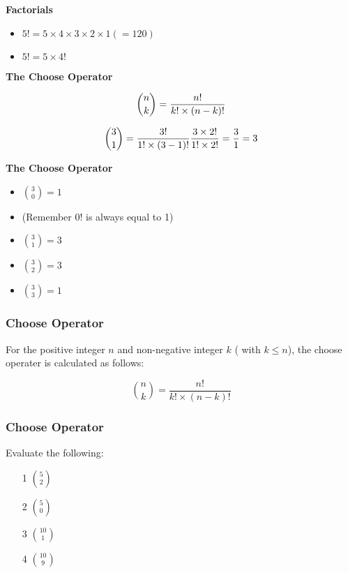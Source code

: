 \documentclass[IntroMain.tex]{subfiles}
\begin{document}
\begin{frame}

\textbf{Factorials}


\begin{itemize}
\item $5! = 5 \times 4 \times 3\times 2 \times 1 (= 120)$
\item $5! = 5 \times 4!$
\end{itemize}


\end{frame}
\begin{frame}
\textbf{The Choose Operator}


\[{n\choose k}  = { n! \over k! \times(n-k)!} \]

\[{3\choose 1}  = { 3! \over 1! \times(3-1)!} { 3 \times 2! \over 1! \times 2!} = \frac{3}{1} = 3 \]


\end{frame}
\begin{frame}
	\textbf{The Choose Operator}

\begin{itemize}
\item ${3 \choose 0} = 1$
\item (Remember $0!$  is always equal to 1)
\item ${3 \choose 1} = 3$
\item ${3 \choose 2} = 3$
\item ${3 \choose 3} = 1$
\end{itemize}
\end{frame}

\begin{frame}
	\frametitle{Choose Operator}
	\Large
	For the positive integer $n$ and non-negative integer $k$ ( with $k\leq n$), the choose operater is calculated as follows:
	
	\[ {n \choose k} = \frac{n!}{k! \times (n-k)!} \]
	
\end{frame}

\begin{frame}
	\frametitle{Choose Operator}
	\Large
	\vspace{-1.5cm}
	Evaluate the following:
	\huge
	\begin{itemize}
		\item[1] ${5 \choose 2}$
		\item[2] ${5 \choose 0}$
		\item[3] ${10 \choose 1}$
		\item[4] ${10 \choose 9}$
	\end{itemize}
\end{frame}
\end{document}
